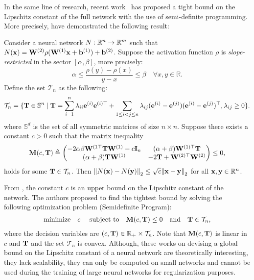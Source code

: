 In the same line of research, recent work~\cite{fazlyab2019safety,fazlyab2019efficient,latorre2020lipschitz} has proposed a tight bound on the Lipschitz constant of the full network with the use of semi-definite programming.
More precisely, \citet{fazlyab2019efficient} have demonstrated the following result:
\begin{theorem} \label{theorem:ch3-lipschite_semidefinite_programming}
  Consider a neural network $N: \mathbb{R}^n \rightarrow \mathbb{R}^m$ such that $N(\mathbf{x}) = \mathbf{W}^{(2)} \rho(\mathbf{W}^{(1)} \mathbf{x} + \mathbf{b}^{(1)}) + \mathbf{b}^{(2)}$.
  Suppose the activation function $\rho$ is \emph{slope-restricted} in the sector $[\alpha,\beta]$, more precisely:
  \begin{equation}
    \alpha \leq \frac{\rho(y) - \rho(x)}{y-x} \leq \beta \quad \forall x,y \in \mathbb{R}. 
  \end{equation}
  Define the set $\mathcal{T}_{n}$ as the following:
  \begin{equation*}
    \mathcal{T}_n = \{\mathbf{T} \in \mathbb{S}^n \mid \mathbf{T} = \sum_{i=1}^{n} \lambda_{ii} \mathbf{e}^{(i)} \mathbf{e}^{(i)\top} + \sum_{1 \leq i<j \leq n} \lambda_{ij}(\mathbf{e}^{(i)} - \mathbf{e}^{(j)})(\mathbf{e}^{(i)}-\mathbf{e}^{(j)})^\top, \lambda_{ij} \geq 0 \}.
  \end{equation*}
  where $\mathbb{S}^d$ is the set of all symmetric matrices of size $n \times n$.
  Suppose there exists a constant $c>0$ such that the matrix inequality
  \begin{align}
    \mathbf{M}(c,\mathbf{T}) \triangleq
      \begin{pmatrix}
      -2\alpha \beta \mathbf{W}^{(1\top} \mathbf{T} \mathbf{W}^{(1)} - c \mathbf{I}_n & (\alpha+\beta) \mathbf{W}^{(1)\top} \mathbf{T}  \\
      (\alpha+\beta) \mathbf{T} \mathbf{W}^{(1)} & -2\mathbf{T}+\mathbf{W}^{(2)\top} \mathbf{W}^{(2)}
      \end{pmatrix}
      \leq 0,
  \end{align}
  holds for some $\mathbf{T} \in \mathcal{T}_{n}$. Then $\norm{N(\mathbf{x})-N(\mathbf{y})}_2 \leq \sqrt{c} \norm{\mathbf{x}-\mathbf{y}}_2$ for all  $\mathbf{x},\mathbf{y} \in \mathbb{R}^n$.
\end{theorem}
\noindent
From , the constant $c$ is an upper bound on the Lipschitz constant of the network.
The authors proposed to find the tightest bound by solving the following optimization problem (Semidefinite Program):
\begin{align}
  \textrm{minimize} \quad c \quad \text{ subject to} \quad \mathbf{M}(c,\mathbf{T}) \leq 0 \quad \text{and} \quad \mathbf{T} \in \mathcal{T}_{n},
\end{align}
where the decision variables are $(c,\mathbf{T}) \in \mathbb{R}_+ \times \mathcal{T}_n$.
Note that $\mathbf{M}(c,\mathbf{T})$ is linear in $c$ and $\mathbf{T}$ and the set $\mathcal{T}_n$ is convex.
Although, these works on devising a global bound on the Lipschitz constant of a neural network are theoretically interesting, they lack scalability, they can only be computed on small networks and cannot be used during the training of large neural networks for regularization purposes.



